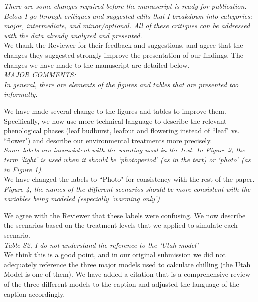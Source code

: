 \documentclass[11pt]{article}
\begin{document}
\emph{There are some changes required before the manuscript is ready for publication. Below I go through critiques and suggested edits that I breakdown into categories: major, intermediate, and minor/optional. All of these critiques can be addressed with the data already analyzed and presented.}\\

\noindent We thank the Reviewer for their feedback and suggestions, and agree that the changes they suggested strongly improve the presentation of our findings. The changes we have made to the manuscript are detailed below.\\

\emph{MAJOR COMMENTS:\\
In general, there are elements of the figures and tables that are presented too informally.}

\noindent We have made several change to the figures and tables to improve them. Specifically, we now use more technical language to describe the relevant phenological phases (leaf budburst, leafout and flowering instead of ``leaf" vs. ``flower") and describe our environmental treatments more precisely. \\

\emph{Some labels are inconsistent with the wording used in the text. In Figure 2, the term `light' is used when it should be `photoperiod' (as in the text) or `photo' (as in Figure 1).}\\

\noindent We have changed the labels to ``Photo" for consistency with the rest of the paper.\\

\emph{Figure 4, the names of the different scenarios should be more consistent with the variables being modeled (especially `warming only')}

\noindent We agree with the Reviewer that these labels were confusing. We now describe the scenarios based on the treatment levels that we applied to simulate each scenario.\\

\emph{Table S2, I do not understand the reference to the `Utah model'}\\

\noindent We think this is a good point, and in our original submission we did not adequately reference the three major models used to calculate chilling (the Utah Model is one of them). We have added a citation that is a comprehensive review of the three different models to the caption and adjusted the language of the caption accordingly.\\
\end{document}
